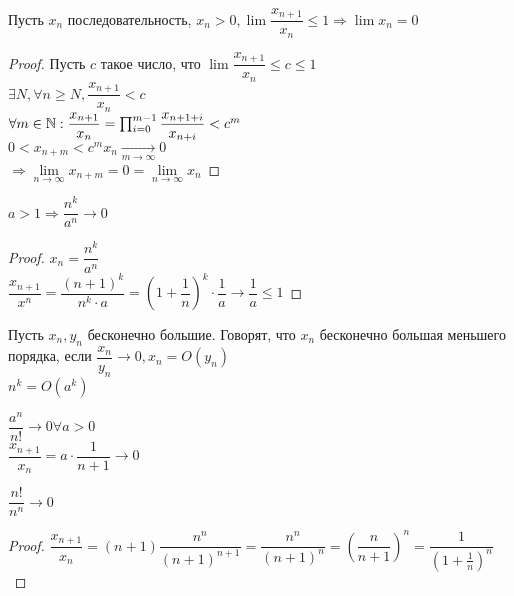 \begin{theorem}
	Пусть $x_n$ последовательность, $ x_n > 0, \lim \dfrac{x_{n+1}}{x_n} \leq 1 \Rightarrow \lim x_n = 0 $
	\begin{proof}
		Пусть $ c $ такое число, что $  \lim \dfrac{x_{n+1}}{x_n} \leq c \leq 1 $ \\
		$ \exists N, \forall n \geq N,  \dfrac{x_{n+1}}{x_n} < c $ \\
		$ \forall m \in \mathbb{N} :  \dfrac{x_{n+1}}{x_n} = \prod_{i=0}^{m-1}  \dfrac{x_{n+1+i}}{x_{n+i}} < c^m $ \\
		$ 0 < x_{n+m} < c^mx_n \underset{m \rightarrow \infty}{\rightarrow} 0 $ \\
		$ \Rightarrow \lim\limits_{n \rightarrow \infty} x_{n+m} = 0 =  \lim\limits_{n \rightarrow \infty} x_{n} $

	\end{proof}
	\begin{consequence}
		$ a > 1 \Rightarrow \dfrac{n^k}{a^n} \rightarrow 0 $
		\begin{proof}
			$ x_n = \dfrac{n^k}{a^n} $ \\
			$ \dfrac{x_{n+1}}{x^n} = \dfrac{(n+1)^k}{n^k \cdot a} = (1 + \dfrac{1}{n})^k \cdot \dfrac{1}{a} \rightarrow \dfrac{1}{a} \leq 1 $
		\end{proof}
	\end{consequence}
\end{theorem}
\begin{definition}
	Пусть $ x_n, y_n $ бесконечно большие. Говорят, что $ x_n $ бесконечно большая меньшего порядка, если $ \dfrac{x_n}{y_n} \rightarrow 0, x_n = O(y_n) $ \\
	$ n^k = O(a^k) $ 
\end{definition}
\begin{consequence}
$ \dfrac{a^n}{n!} \rightarrow 0 \forall a > 0 $ \\

$ \dfrac{x_{n+1}}{x_n} = a \cdot \dfrac{1}{n+1} \rightarrow 0 $ 
\end{consequence}
\begin{consequence}
	$ \dfrac{n!}{n^n} \rightarrow 0 $ \\
	\begin{proof}
		$ \dfrac{x_{n+1}}{x_n} = (n+1)\dfrac{n^n}{(n+1)^{n+1}} = \dfrac{n^n}{(n+1)^n} = (\dfrac{n}{n+1})^n = \dfrac{1}{(1+\frac{1}{n})^n} $
	\end{proof}
	
\end{consequence}

